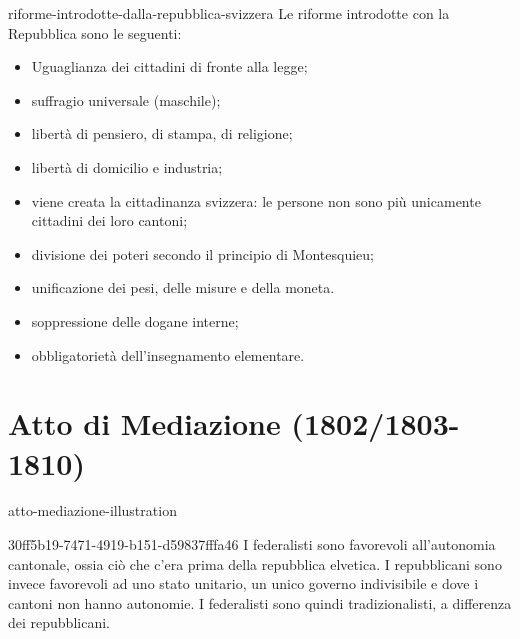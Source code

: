 \documentclass[preview]{standalone}
\begin{document}
\begin{snippet}{riforme-introdotte-dalla-repubblica-svizzera}
    Le riforme introdotte con la Repubblica sono le seguenti:
    \begin{itemize}
        \item Uguaglianza dei cittadini di fronte alla legge;
        \item suffragio universale (maschile);
        \item libertà di pensiero, di stampa, di religione;
        \item libertà di domicilio e industria;
        \item viene creata la cittadinanza svizzera: le persone non sono più unicamente cittadini dei loro cantoni;
        \item divisione dei poteri secondo il principio di Montesquieu;
        \item unificazione dei pesi, delle misure e della moneta.
        \item soppressione delle dogane interne;
        \item obbligatorietà dell'insegnamento elementare.
    \end{itemize}
\end{snippet}


\section{Atto di Mediazione (1802/1803-1810)}

\begin{snippet}{atto-mediazione-illustration}
    \begin{center}
    \end{center}
\end{snippet}

\begin{snippet}{30ff5b19-7471-4919-b151-d59837fffa46}
    I federalisti sono favorevoli all'autonomia cantonale, ossia ciò che c'era prima della repubblica elvetica.
    I repubblicani sono invece favorevoli ad uno stato unitario, un unico governo indivisibile e dove i cantoni non hanno autonomie.
    I federalisti sono quindi tradizionalisti, a differenza dei repubblicani.
\end{snippet}
\end{document}
